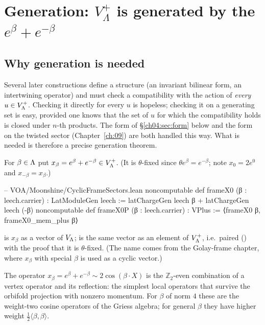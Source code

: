 \section{Generation: \texorpdfstring{$V_\Lambda^+$}{V+} is generated by the \texorpdfstring{$e^\beta+e^{-\beta}$}{e(b)+e(-b)}}\label{ch04:sec:generation}

\subsection{Why generation is needed}

Several later constructions define a structure (an invariant bilinear form, an intertwining
operator) and must check a compatibility with the action of \emph{every} $u\in V_{\Lambda}^+$. Checking
it directly for every $u$ is hopeless; checking it on a generating set is easy, provided one knows
that the set of $u$ for which the compatibility holds is closed under $n$-th products. The form
of \S\ref{ch04:sec:form} below and the form  on the twisted sector
(Chapter~\ref{ch:09}) are both handled this way. What is needed is therefore a precise generation
theorem.

\begin{definition}\label{ch04:def:xbeta}
For $\beta\in{\Lambda}$ put $x_\beta=e^\beta+e^{-\beta}\in V_{\Lambda}^+$. (It is $\theta$-fixed since
$\theta e^\beta=e^{-\beta}$; note $x_0=2e^0$ and $x_{-\beta}=x_\beta$.)
\end{definition}

\begin{leancode}
-- VOA/Moonshine/CyclicFrameSectors.lean
noncomputable def frameX0 (β : leech.carrier) : LatModuleGen leech :=
  latChargeGen leech β + latChargeGen leech (-β)
noncomputable def frameX0P (β : leech.carrier) : VPlus := ⟨frameX0 β, frameX0_mem_plus β⟩
\end{leancode}

\begin{dictionary}
 is $x_\beta$ as a vector of $V_{\Lambda}$;  is the same vector as an
element of $V_{\Lambda}^+$, i.e.\ paired () with the proof  that it
is $\theta$-fixed. (The name comes from the Golay-frame chapter, where $x_\beta$ with special $\beta$
is used as a cyclic vector.)
\end{dictionary}

\begin{physics}
The operator $x_\beta=e^\beta+e^{-\beta}\sim2\cos(\beta\cdot X)$ is the $\mathbb Z_2$-even combination of a vertex operator and its reflection: the simplest local operators that survive the orbifold projection with nonzero momentum. For $\beta$ of norm $4$ these are the weight-two cosine operators of the Griess algebra; for general $\beta$ they have higher weight $\tfrac12\langle\beta,\beta\rangle$.
\end{physics}

